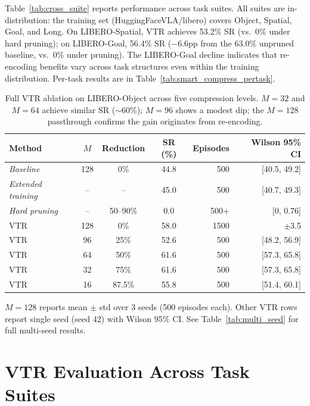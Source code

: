 Table~\ref{tab:cross_suite} reports performance across task suites. All suites are in-distribution: the training set (HuggingFaceVLA/libero) covers Object, Spatial, Goal, and Long. On LIBERO-Spatial, VTR achieves 53.2\% SR (vs.\ 0\% under hard pruning); on LIBERO-Goal, 56.4\% SR ($-6.6$pp from the 63.0\% unpruned baseline, vs.\ 0\% under pruning). The LIBERO-Goal decline indicates that re-encoding benefits vary across task structures even within the training distribution. Per-task results are in Table~\ref{tab:smart_compress_pertask}.

\begin{table}[ht]
\centering
\small
\caption{Full VTR ablation on LIBERO-Object across five compression levels. $M{=}32$ and $M{=}64$ achieve similar SR ($\sim$60\%); $M{=}96$ shows a modest dip; the $M{=}128$ passthrough confirms the gain originates from re-encoding.}
\label{tab:smart_compress_full}
\begin{tabular}{lcccrr}
\toprule
Method & $M$ & Reduction & SR (\%) & Episodes & Wilson 95\% CI \\
\midrule
\textit{Baseline} & 128 & 0\% & 44.8 & 500 & [40.5, 49.2] \\
\textit{Extended training} & -- & -- & 45.0 & 500 & [40.7, 49.3] \\
\textit{Hard pruning} & -- & 50--90\% & 0.0 & 500+ & [0, 0.76] \\
\midrule
VTR & 128 & 0\% & 58.0 & 1500 & $\pm$3.5 \\
VTR & 96 & 25\% & 52.6 & 500 & [48.2, 56.9] \\
VTR & 64 & 50\% & 61.6 & 500 & [57.3, 65.8] \\
VTR & 32 & 75\% & 61.6 & 500 & [57.3, 65.8] \\
VTR & 16 & 87.5\% & 55.8 & 500 & [51.4, 60.1] \\
\bottomrule
\end{tabular}

\vspace{2pt}
{\footnotesize $M{=}128$ reports mean $\pm$ std over 3 seeds (500 episodes each). Other VTR rows report single seed (seed 42) with Wilson 95\% CI. See Table~\ref{tab:multi_seed} for full multi-seed results.}
\end{table}


\section{VTR Evaluation Across Task Suites}
\label{app:cross_suite}

